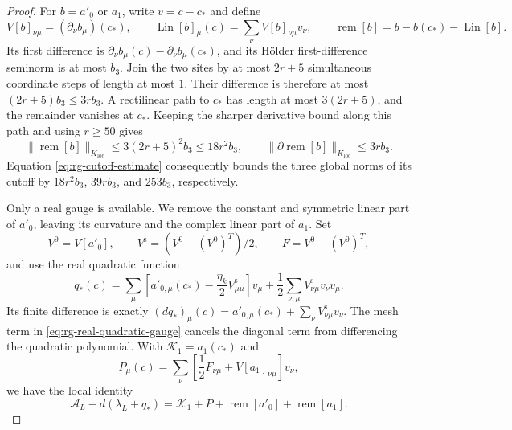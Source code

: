 \begin{proof}
For $b=a'_0$ or $a_1$, write $v=c-c_*$ and define
\[
 V[b]_{\nu\mu}=(\partial_\nu b_\mu)(c_*),\qquad
 \operatorname{Lin}[b]_\mu(c)=\sum_\nu V[b]_{\nu\mu}v_\nu,
 \qquad
 \operatorname{rem}[b]=b-b(c_*)-\operatorname{Lin}[b].
\]
Its first difference is
$\partial_\nu b_\mu(c)-\partial_\nu b_\mu(c_*)$,
and its H\"older first-difference seminorm is at most
$b_3$. Join the two sites by at most $2r+5$ simultaneous
coordinate steps of length at most $1$. Their difference
is therefore at most $(2r+5)b_3\le3rb_3$. A rectilinear
path to $c_*$ has length at most $3(2r+5)$, and the
remainder vanishes at $c_*$. Keeping the sharper derivative
bound along this path and using $r\ge50$ gives
\[
 \|\operatorname{rem}[b]\|_{K_{\mathrm{loc}}}
              \le3(2r+5)^2b_3\le18r^2b_3,\qquad
 \|\partial\operatorname{rem}[b]\|_{K_{\mathrm{loc}}}
              \le3rb_3.
\]
Equation \eqref{eq:rg-cutoff-estimate} consequently bounds
the three global norms of its cutoff by
$18r^2b_3$, $39rb_3$, and $253b_3$, respectively.

Only a real gauge is available. We remove the constant
and symmetric linear part of $a'_0$, leaving its curvature
and the complex linear part of $a_1$. Set
\[
 V^0=V[a'_0],\qquad
 V^{\mathrm s}=(V^0+(V^0)^T)/2,\qquad
 F=V^0-(V^0)^T,
\]
and use the real quadratic function
\begin{equation}\label{eq:rg-real-quadratic-gauge}
 q_*(c)=\sum_\mu\left[a'_{0,\mu}(c_*)-
                    \frac{\eta_k}{2}V^{\mathrm s}_{\mu\mu}\right]v_\mu
              +\frac12\sum_{\nu,\mu}V^{\mathrm s}_{\nu\mu}v_\nu v_\mu.
\end{equation}
Its finite difference is exactly
$(dq_*)_\mu(c)=a'_{0,\mu}(c_*)+
\sum_\nu V^{\mathrm s}_{\nu\mu}v_\nu$.
The mesh term in \eqref{eq:rg-real-quadratic-gauge} cancels
the diagonal term from differencing the quadratic polynomial.
With $\mathscr K_1=a_1(c_*)$ and
\[
 P_\mu(c)=\sum_\nu
                    \left[\frac12F_{\nu\mu}+V[a_1]_{\nu\mu}\right]v_\nu,
\]
we have the local identity
\begin{equation}\label{eq:rg-local-taylor-gauge}
 \mathscr A_L-d(\lambda_L+q_*)=
       \mathscr K_1+P+\operatorname{rem}[a'_0]+\operatorname{rem}[a_1].
\end{equation}


\end{proof}
